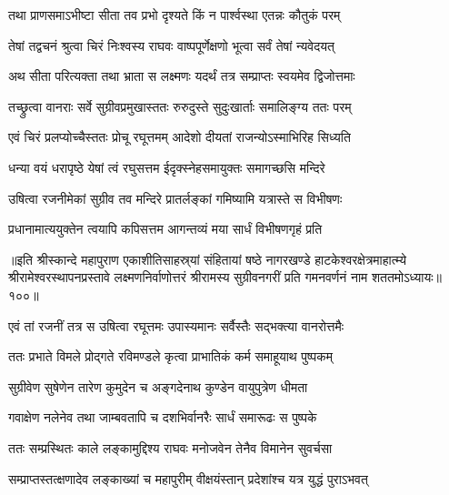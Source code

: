 \twolineshloka
{तथा प्राणसमाऽभीष्टा सीता तव प्रभो}
{दृश्यते किं न पार्श्वस्था एतन्नः कौतुकं परम्}%


\twolineshloka
{तेषां तद्वचनं श्रुत्वा चिरं निःश्वस्य राघवः}
{वाष्पपूर्णेक्षणो भूत्वा सर्वं तेषां न्यवेदयत्}%

\twolineshloka
{अथ सीता परित्यक्ता तथा भ्राता स लक्ष्मणः}
{यदर्थं तत्र सम्प्राप्तः स्वयमेव द्विजोत्तमाः}%

\twolineshloka
{तच्छ्रुत्वा वानराः सर्वे सुग्रीवप्रमुखास्ततः}
{रुरुदुस्ते सुदुःखार्ताः समालिङ्ग्य ततः परम्}%

\twolineshloka
{एवं चिरं प्रलप्योच्चैस्ततः प्रोचू रघूत्तमम्}
{आदेशो दीयतां राजन्योऽस्माभिरिह सिध्यति}%

\twolineshloka
{धन्या वयं धरापृष्ठे येषां त्वं रघुसत्तम}
{ईदृक्स्नेहसमायुक्तः समागच्छसि मन्दिरे}%


\twolineshloka
{उषित्वा रजनीमेकां सुग्रीव तव मन्दिरे} 
{प्रातर्लङ्कां गमिष्यामि यत्रास्ते स विभीषणः}%

\twolineshloka
{प्रधानामात्ययुक्तेन त्वयापि कपिसत्तम}
{आगन्तव्यं मया सार्धं विभीषणगृहं प्रति}%

॥इति श्रीस्कान्दे महापुराण एकाशीतिसाहस्र्यां संहितायां षष्ठे नागरखण्डे हाटकेश्वरक्षेत्रमाहात्म्ये श्रीरामेश्वरस्थापनप्रस्तावे लक्ष्मणनिर्वाणोत्तरं श्रीरामस्य सुग्रीवनगरीं प्रति गमनवर्णनं नाम शततमोऽध्यायः॥१००॥

\resetShloka


\twolineshloka
{एवं तां रजनीं तत्र स उषित्वा रघूत्तमः}
{उपास्यमानः सर्वैस्तैः सद्भक्त्या वानरोत्तमैः}%

\twolineshloka
{ततः प्रभाते विमले प्रोद्गते रविमण्डले}
{कृत्वा प्राभातिकं कर्म समाहूयाथ पुष्पकम्}%

\twolineshloka
{सुग्रीवेण सुषेणेन तारेण कुमुदेन च}
{अङ्गदेनाथ कुण्डेन वायुपुत्रेण धीमता}%

\twolineshloka
{गवाक्षेण नलेनेव तथा जाम्बवतापि च}
{दशभिर्वानरैः सार्धं समारूढः स पुष्पके}%

\twolineshloka
{ततः सम्प्रस्थितः काले लङ्कामुद्दिश्य राघवः}
{मनोजवेन तेनैव विमानेन सुवर्चसा}%

\twolineshloka
{सम्प्राप्तस्तत्क्षणादेव लङ्काख्यां च महापुरीम्}
{वीक्षयंस्तान् प्रदेशांश्च यत्र युद्धं पुराऽभवत्}%


